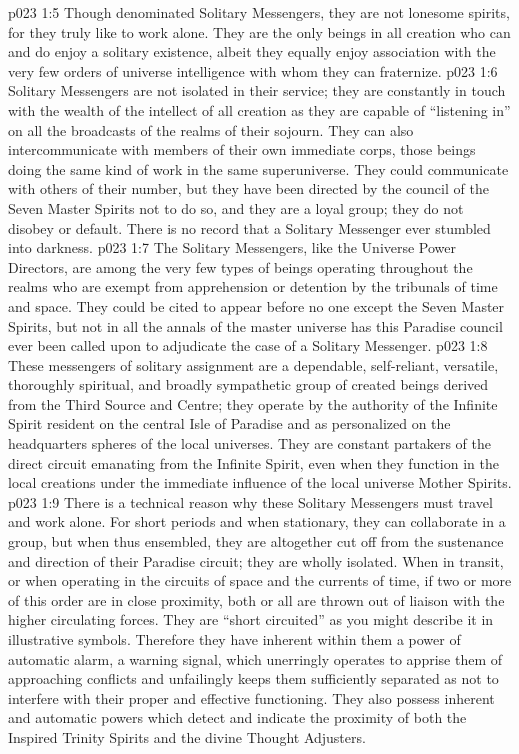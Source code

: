 \vs p023 1:5 Though denominated Solitary Messengers, they are not lonesome spirits, for they truly like to work alone. They are the only beings in all creation who can and do enjoy a solitary existence, albeit they equally enjoy association with the very few orders of universe intelligence with whom they can fraternize.
\vs p023 1:6 \pc Solitary Messengers are not isolated in their service; they are constantly in touch with the wealth of the intellect of all creation as they are capable of “listening in” on all the broadcasts of the realms of their sojourn. They can also intercommunicate with members of their own immediate corps, those beings doing the same kind of work in the same superuniverse. They could communicate with others of their number, but they have been directed by the council of the Seven Master Spirits not to do so, and they are a loyal group; they do not disobey or default. There is no record that a Solitary Messenger ever stumbled into darkness.
\vs p023 1:7 The Solitary Messengers, like the Universe Power Directors, are among the very few types of beings operating throughout the realms who are exempt from apprehension or detention by the tribunals of time and space. They could be cited to appear before no one except the Seven Master Spirits, but not in all the annals of the master universe has this Paradise council ever been called upon to adjudicate the case of a Solitary Messenger.
\vs p023 1:8 These messengers of solitary assignment are a dependable, self\hyp{}reliant, versatile, thoroughly spiritual, and broadly sympathetic group of created beings derived from the Third Source and Centre; they operate by the authority of the Infinite Spirit resident on the central Isle of Paradise and as personalized on the headquarters spheres of the local universes. They are constant partakers of the direct circuit emanating from the Infinite Spirit, even when they function in the local creations under the immediate influence of the local universe Mother Spirits.
\vs p023 1:9 \pc There is a technical reason why these Solitary Messengers must travel and work alone. For short periods and when stationary, they can collaborate in a group, but when thus ensembled, they are altogether cut off from the sustenance and direction of their Paradise circuit; they are wholly isolated. When in transit, or when operating in the circuits of space and the currents of time, if two or more of this order are in close proximity, both or all are thrown out of liaison with the higher circulating forces. They are “short circuited” as you might describe it in illustrative symbols. Therefore they have inherent within them a power of automatic alarm, a warning signal, which unerringly operates to apprise them of approaching conflicts and unfailingly keeps them sufficiently separated as not to interfere with their proper and effective functioning. They also possess inherent and automatic powers which detect and indicate the proximity of both the Inspired Trinity Spirits and the divine Thought Adjusters.
